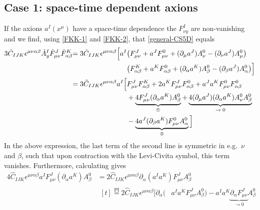 \documentclass[12pt,twoside]{book}
\begin{document}
\begin{appendices}
\subsection{Case 1: space-time dependent axions}
\label{app:axions(x)}

If the axions $a^{I}(x^{\mu})$ have a space-time dependence the $F^{I}_{\nu y}$ are non-vanishing and we find, using \eqref{FKK-1} and \eqref{FKK-2}, that \eqref{general-CS5D} equals
\begin{align}
3\hat{C}_{IJK} \epsilon^{\mu\nu\alpha\beta} \hat{A}^{I}_{y}\hat{F}^{J}_{\mu\nu} \hat{F}^{K}_{\alpha\beta}
&\begin{aligned}[t]=
3\hat{C}_{IJK}\epsilon^{\mu\nu\alpha\beta} \Big[
a^{I}&  \big(F^{J}_{\mu\nu} + a^{J}F^{0}_{\mu\nu} + 
(\partial_{\mu} a^{J}) A^{0}_{\nu} - (\partial_{\nu} a^{J}) A^{0}_{\mu}\big) \\
 &\big(F^{K}_{\alpha\beta} + a^{K}F^{0}_{\alpha\beta} + 
(\partial_{\alpha} a^{K}) A^{0}_{\beta} - (\partial_{\beta} a^{J}) A^{0}_{\alpha}\big)
\Big]
\end{aligned}\notag \\
&\begin{aligned}[t]=
3\hat{C}_{IJK} \epsilon^{\mu\nu\alpha\beta} a^{I} \Big[
&F^{J}_{\mu\nu} F^{K}_{\alpha\beta} + 2 a^{K}F^{J}_{\mu\nu} F^{0}_{\alpha\beta} + a^{J}a^{K} F^{0}_{\mu\nu}F^{0}_{\alpha\beta} \\
&+ \underbrace{4 F^{J}_{\mu\nu}(\partial_{\alpha}a^{K}) A^{0}_{\beta}}_\text{\ding{192}}
+ \underbrace{4 (\partial_{\mu}a^{J})(\partial_{\alpha}a^{K}) A^{0}_{\nu}A^{0}_{\beta}}_\text{$\rightarrow 0$}\\
 &- \underbrace{4 a^{J}(\partial_{\beta} a^{K})F^{0}_{\mu\nu}A^{0}_{\alpha}}_\text{\ding{193}}
\Big]
\end{aligned}\label{app:CSred1}
\end{align}
In the above expression, the last term of the second line is symmetric in e.g.\ $\nu$ and $\beta$, such that upon contraction with the Levi-Civita symbol, this term vanishes. Furthermore, calculating  gives
\begin{align*}
4\hat{C}_{IJK}\epsilon^{\mu\nu\alpha\beta} a^{I} F^{J}_{\mu\nu}(\partial_{\alpha}a^{K}) A^{0}_{\beta} 
&=
2\hat{C}_{IJK}\epsilon^{\mu\nu\alpha\beta} \partial_{\alpha}(a^{I} a^{K}) F^{J}_{\mu\nu}A^{0}_{\beta}\\
&\begin{aligned}[t]
\stackrel{\text{PI}}{=}
2\hat{C}_{IJK}\epsilon^{\mu\nu\alpha\beta} \Big[
\partial_{\alpha}(&a^{I} a^{K}F^{J}_{\mu\nu}A^{0}_{\beta}) - a^{I}a^{K}\underbrace{\partial_{\alpha}F^{J}_{\mu\nu}}_\text{$\rightarrow 0$}A^{0}_{\beta}\\

\end{aligned}
\end{align*}
\end{appendices}
\end{document}
